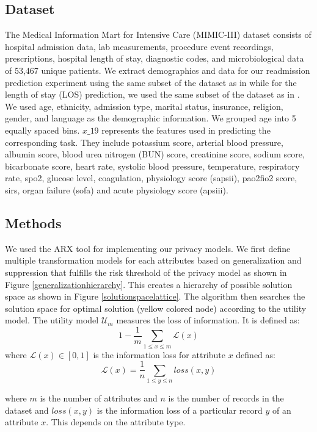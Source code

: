 \documentclass{bioinfo}
\begin{document}
\begin{methods}
\subsection{Dataset}
The Medical Information Mart for Intensive Care (MIMIC-III) \cite{johnson2016mimic} dataset consists of hospital admission data, lab measurements, procedure event recordings, prescriptions, hospital length of stay, diagnostic codes, and microbiological data of 53,467 unique patients. We extract demographics and data for our readmission prediction experiment using the same subset of the dataset as in \cite{pakbin2018prediction} while for the length of stay (LOS) prediction, we used the same subset of the dataset as in \cite{tang2018predictive}. We used age, ethnicity, admission type, marital status, insurance, religion, gender, and language as the demographic information. We grouped age into 5 equally spaced bins. $x\_19$ represents the features used in predicting the corresponding task. They include potassium score, arterial blood pressure, albumin score, blood urea nitrogen (BUN) score, creatinine score, sodium score, bicarbonate score, heart rate, systolic blood pressure, temperature, respiratory rate, spo2, glucose level, coagulation, physiology score (sapsii), pao2fio2 score, sirs, organ failure (sofa) and acute physiology score (apsiii).

\subsection{Methods}
\label{sec:methods}
We used the ARX tool \cite{prasser2020flexible} for implementing our privacy models. We first define multiple transformation models for each attributes based on generalization and suppression that fulfills the risk threshold of the privacy model as shown in Figure \ref{generalizationhierarchy}. This creates a hierarchy of possible solution space as shown in Figure \ref{solutionspacelattice}. The algorithm then searches the solution space for optimal solution (yellow colored node) according to the utility model. The utility model $\mathcal{U}_m$ measures the loss of information. It is defined as:
$$1-\frac{1}{m}\sum_{1\leq x \leq m} \mathcal{L}(x)$$
where $\mathcal{L}(x) \in [0,1]$ is the information loss for attribute $x$ defined as:
$$\mathcal{L}(x) = \frac{1}{n} \sum_{1 \leq y \leq n} loss(x,y)$$ 

where $m$ is the number of attributes and $n$ is the number of records in the dataset and $loss(x,y)$ is the information loss of a particular record $y$ of an attribute $x$. This depends on the attribute type.


\end{methods}
\end{document}
